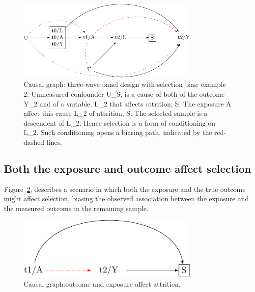 \documentclass[
  singlecolumn]{report}
\begin{document}
\begin{figure}

{\centering \includegraphics[width=0.8\textwidth,height=\textheight]{causal-dags_files/figure-pdf/fig-dag-8-2-1.pdf}

}

\caption{\label{fig-dag-8-2}Causal graph: three-wave panel design with
selection bias: example 2: Unmeasured confounder U\_S, is a cause of
both of the outcome Y\_2 and of a variable, L\_2 that affects attrition,
S. The exposure A affect this cause L\_2 of attrition, S. The selected
sample is a descendent of L\_2. Hence selection is a form of
conditioning on L\_2. Such conditioning opens a biasing path, indicated
by the red-dashed lines.}

\end{figure}

\hypertarget{both-the-exposure-and-outcome-affect-selection}{%
\subsection{Both the exposure and outcome affect
selection}\label{both-the-exposure-and-outcome-affect-selection}}

Figure~\ref{fig-dag-8-5}, describes a scenario in which both the
exposure and the true outcome might affect selection, biasing the
observed association between the exposure and the measured outcome in
the remaining sample.

\begin{figure}

{\centering \includegraphics[width=0.8\textwidth,height=\textheight]{causal-dags_files/figure-pdf/fig-dag-8-5-1.pdf}

}

\caption{\label{fig-dag-8-5}Causal graph:outcome and exposure affect
attrition.}

\end{figure}
\end{document}

